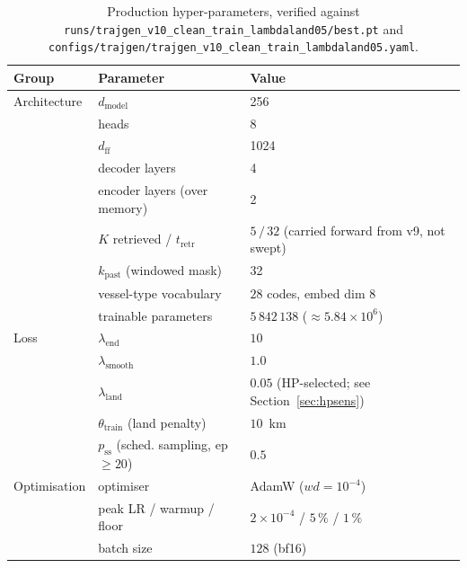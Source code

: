 \documentclass[oneside, a4paper, onecolumn, 11pt]{article}
\begin{document}
\begin{table}[h]
\centering
\caption{Production hyper-parameters, verified against
\texttt{runs/trajgen\_v10\_clean\_train\_lambdaland05/best.pt} and
\texttt{configs/trajgen/trajgen\_v10\_clean\_train\_lambdaland05.yaml}.}
\label{tab:hp}
\begin{tabular}{lll}
\toprule
\textbf{Group} & \textbf{Parameter} & \textbf{Value} \\
\midrule
Architecture & $d_{\mathrm{model}}$            & 256 \\
             & heads                           & 8 \\
             & $d_{\mathrm{ff}}$               & 1024 \\
             & decoder layers                  & 4 \\
             & encoder layers (over memory)    & 2 \\
             & $K$ retrieved / $t_{\mathrm{retr}}$ & $5\,/\,32$
                                                 (carried forward from v9,
                                                  not swept) \\
             & $k_{\mathrm{past}}$ (windowed mask) & 32 \\
             & vessel-type vocabulary          & $28$ codes, embed dim $8$ \\
             & trainable parameters            & $5\,842\,138$
                                                 ($\approx 5.84 \times 10^6$) \\
\midrule
Loss         & $\lambda_{\mathrm{end}}$        & $10$ \\
             & $\lambda_{\mathrm{smooth}}$     & $1.0$ \\
             & $\lambda_{\mathrm{land}}$       & $0.05$
                                                 (HP-selected; see
                                                  Section~\ref{sec:hpsens}) \\
             & $\theta_{\mathrm{train}}$ (land penalty) & $10$~km \\
             & $p_{\mathrm{ss}}$ (sched. sampling, ep $\geq 20$) & $0.5$ \\
\midrule
Optimisation & optimiser                       & AdamW ($wd = 10^{-4}$) \\
             & peak LR / warmup / floor        & $2 \times 10^{-4}$ /
                                                 $5\,\%$ / $1\,\%$ \\
             & batch size                      & $128$ (bf16) \\

\end{tabular}
\end{table}
\end{document}
